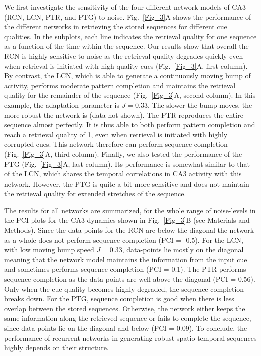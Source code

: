 \documentclass[utf8]{frontiersSCNS} %
\begin{document}
We first investigate the sensitivity of the four different network models of CA3 (RCN, LCN, PTR, and PTG) to noise. Fig.~\ref{Fig_3}A shows the performance of the different networks in retrieving the stored sequences for different cue qualities. In the subplots, each line indicates the retrieval quality for one sequence as a function of the time within the sequence. Our results show that overall the RCN is highly sensitive to noise as the retrieval quality degrades quickly even when retrieval is initiated with high quality cues (Fig.~\ref{Fig_3}A, first column). 
By contrast, the LCN, which is able to generate a continuously moving bump of activity, performs moderate pattern completion and maintains the retrieval quality for the remainder of the sequence (Fig.~\ref{Fig_3}A, second column). In this example, the adaptation parameter is $J = 0.33$. The slower the bump moves, the more robust the network is (data not shown).
The PTR reproduces the entire sequence almost perfectly. It is thus able to both perform pattern completion and reach a retrieval quality of 1, even when retrieval is initiated with highly corrupted cues. This network therefore can perform sequence completion (Fig.~\ref{Fig_3}A, third column).
Finally, we also tested the performance of the PTG (Fig.~\ref{Fig_3}A, last column). Its performance is somewhat similar to that of the LCN, which shares the temporal correlations in CA3 activity  with this network. However, the PTG is quite a bit more sensitive and does not maintain the retrieval quality for extended stretches of the sequence.

The results for all networks are summarized, for the whole range of noise-levels in the PCI plots for the CA3 dynamics shown in Fig.~\ref{Fig_3}B (see Materials and Methods). Since the data points for the RCN are below the diagonal the network as a whole does not perform sequence completion (PCI = -0.5). For the LCN, with low moving bump speed $J = 0.33$, data-points lie mostly on the diagonal meaning that the network model maintains the information from the input cue and sometimes performs sequence completion (PCI = 0.1). The PTR performs sequence completion as the data points are well above the diagonal (PCI = 0.56). Only when the cue quality becomes highly degraded, the sequence completion breaks down. For the PTG, sequence completion is good when there is less overlap between the stored sequences. Otherwise, the network either keeps the same information along the retrieved sequence or fails to complete the sequence, since data points lie on the diagonal and below (PCI = 0.09). To conclude, the performance of recurrent networks in generating robust spatio-temporal sequences highly depends on their structure.  
\end{document}
